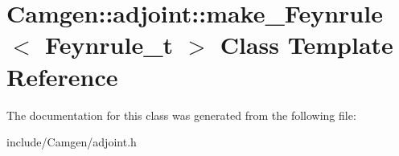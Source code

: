 \hypertarget{a00344}{}\section{Camgen\+:\+:adjoint\+:\+:make\+\_\+\+Feynrule$<$ Feynrule\+\_\+t $>$ Class Template Reference}
\label{a00344}


The documentation for this class was generated from the following file\+:\begin{DoxyCompactItemize}
\item 
include/\+Camgen/adjoint.\+h\end{DoxyCompactItemize}
